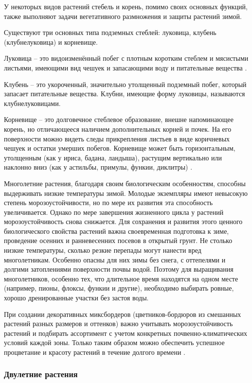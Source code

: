У некоторых видов растений стебель и корень, помимо своих основных функций, также выполняют задачи вегетативного размножения и защиты растений зимой.

Существуют три основных типа подземных стеблей: луковица, клубень (клубнелуковица) и корневище.

Луковица – это видоизменённый побег с плотным коротким стеблем и мясистыми листьями, имеющими вид чешуек и запасающими воду и питательные вещества \cite{belyaevskaya}.

Клубень -- это укороченный, значительно утолщенный подземный побег, который запасает питательные вещества. Клубни, имеющие форму луковицы, называются клубнелуковицами.

Корневище -- это долговечное стеблевое образование, внешне напоминающее корень, но отличающееся наличием дополнительных корней и почек. На его поверхности можно видеть следы прикрепления листьев в виде коричневых чешуек и остатки умерших побегов. Корневище может быть горизонтальным, утолщенным (как у ириса, бадана, ландыша), растущим вертикально или наклонно вниз (как у астильбы, примулы, функии, диклитры) \cite{aldohina}.

Многолетние растения, благодаря своим биологическим особенностям, способны выдерживать низкие температуры зимой. Молодые экземпляры имеют невысокую степень морозоустойчивости, но по мере их развития эта способность увеличивается. Однако по мере завершения жизненного цикла у растений морозоустойчивость снова снижается. Для сохранения и развития этого ценного биологического свойства растений важна своевременная подготовка к зиме, проведение осенних и ранневесенних посевов в открытый грунт. Не столько низкие температуры, сколько резкие перепады могут нанести вред многолетникам. Особенно опасны для них зимы без снега, с оттепелями и долгими затоплениями поверхности почвы водой. Поэтому для выращивания многолетников, особенно тех, что длительное время находятся на одном месте (например, пионы, флоксы, функии и другие), необходимо выбирать ровные, хорошо дренированные участки без застоя воды.

При создании декоративных миксбордеров (цветников-бордюров из смешанных растений разных размеров и оттенков) важно учитывать морозоустойчивость растений и подбирать ассортимент с учетом конкретных почвенно-климатических условий каждой зоны. Только таким образом можно обеспечить успешное процветание и красоту растений в течение долгого времени \cite{karpisonova}.

\subsubsection{Двулетние растения}

